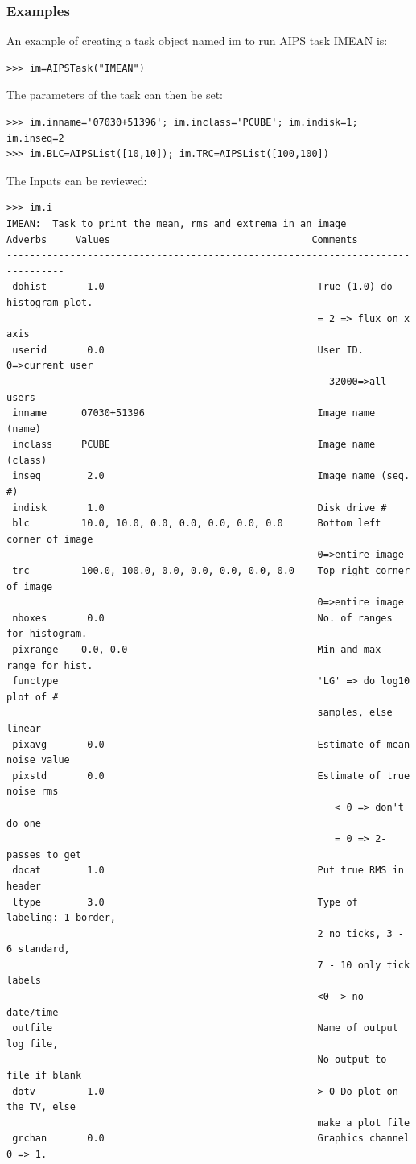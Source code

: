 \documentclass[11pt]{report}
\begin{document}
\subsubsection{Examples}
An example of creating a task object named im to run AIPS task IMEAN
is: 
\begin{verbatim}
>>> im=AIPSTask("IMEAN")
\end{verbatim}
The parameters of the task can then be set:
\begin{verbatim}
>>> im.inname='07030+51396'; im.inclass='PCUBE'; im.indisk=1; im.inseq=2
>>> im.BLC=AIPSList([10,10]); im.TRC=AIPSList([100,100])
\end{verbatim}
The Inputs can be reviewed:
\begin{verbatim}
>>> im.i
IMEAN:  Task to print the mean, rms and extrema in an image
Adverbs     Values                                   Comments
--------------------------------------------------------------------------------
 dohist      -1.0                                     True (1.0) do histogram plot.
                                                      = 2 => flux on x axis
 userid       0.0                                     User ID.  0=>current user
                                                        32000=>all users
 inname      07030+51396                              Image name (name)
 inclass     PCUBE                                    Image name (class)
 inseq        2.0                                     Image name (seq. #)
 indisk       1.0                                     Disk drive #
 blc         10.0, 10.0, 0.0, 0.0, 0.0, 0.0, 0.0      Bottom left corner of image
                                                      0=>entire image
 trc         100.0, 100.0, 0.0, 0.0, 0.0, 0.0, 0.0    Top right corner of image
                                                      0=>entire image
 nboxes       0.0                                     No. of ranges for histogram.
 pixrange    0.0, 0.0                                 Min and max range for hist.
 functype                                             'LG' => do log10 plot of #
                                                      samples, else linear
 pixavg       0.0                                     Estimate of mean noise value
 pixstd       0.0                                     Estimate of true noise rms
                                                         < 0 => don't do one
                                                         = 0 => 2-passes to get
 docat        1.0                                     Put true RMS in header
 ltype        3.0                                     Type of labeling: 1 border,
                                                      2 no ticks, 3 - 6 standard,
                                                      7 - 10 only tick labels
                                                      <0 -> no date/time
 outfile                                              Name of output log file,
                                                      No output to file if blank
 dotv        -1.0                                     > 0 Do plot on the TV, else
                                                      make a plot file
 grchan       0.0                                     Graphics channel 0 => 1.
\end{verbatim}
\end{document}
